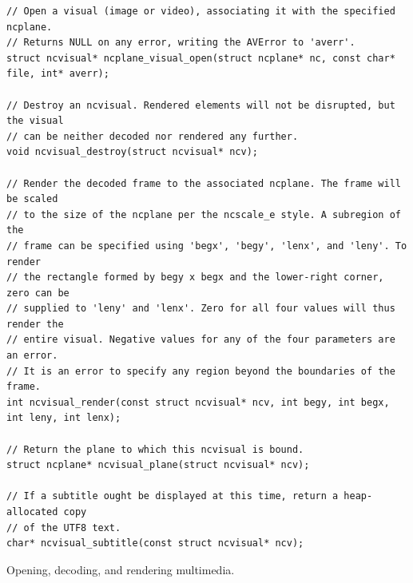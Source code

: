 \documentclass[letterpaper,10pt]{article}
\begin{document}
\begin{listing}[!htb]
\begin{verbatim}
// Open a visual (image or video), associating it with the specified ncplane.
// Returns NULL on any error, writing the AVError to 'averr'.
struct ncvisual* ncplane_visual_open(struct ncplane* nc, const char* file, int* averr);

// Destroy an ncvisual. Rendered elements will not be disrupted, but the visual
// can be neither decoded nor rendered any further.
void ncvisual_destroy(struct ncvisual* ncv);

// Render the decoded frame to the associated ncplane. The frame will be scaled
// to the size of the ncplane per the ncscale_e style. A subregion of the
// frame can be specified using 'begx', 'begy', 'lenx', and 'leny'. To render
// the rectangle formed by begy x begx and the lower-right corner, zero can be
// supplied to 'leny' and 'lenx'. Zero for all four values will thus render the
// entire visual. Negative values for any of the four parameters are an error.
// It is an error to specify any region beyond the boundaries of the frame.
int ncvisual_render(const struct ncvisual* ncv, int begy, int begx, int leny, int lenx);

// Return the plane to which this ncvisual is bound.
struct ncplane* ncvisual_plane(struct ncvisual* ncv);

// If a subtitle ought be displayed at this time, return a heap-allocated copy
// of the UTF8 text.
char* ncvisual_subtitle(const struct ncvisual* ncv);
\end{verbatim}
\caption{Opening, decoding, and rendering multimedia.}
\label{list:multimedia}
\end{listing}
\end{document}
